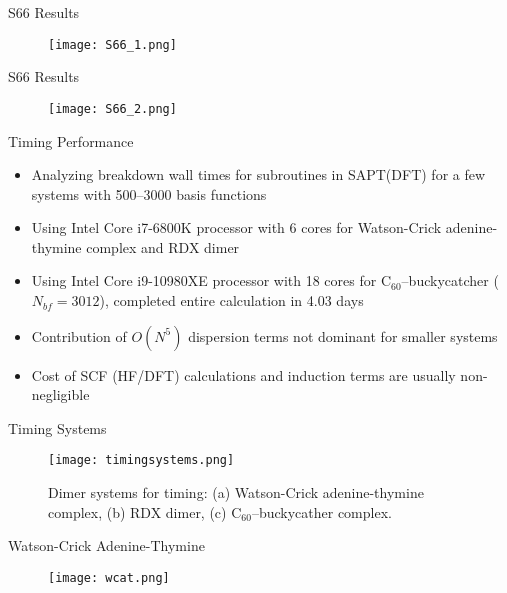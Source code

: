 \documentclass{beamer}
\begin{document}
        \begin{frame}{S66 Results}
            \begin{figure}
                \centering
                \texttt{[image: S66\_1.png]}
            \end{figure}  
        \end{frame}

        \begin{frame}{S66 Results}
            \begin{figure}
                \centering
                \texttt{[image: S66\_2.png]}
            \end{figure}  
        \end{frame}

        \begin{frame}{Timing Performance}
            \begin{itemize}
                \item Analyzing breakdown wall times for subroutines in SAPT(DFT) for a few systems with 500--3000 basis functions
                \item Using Intel Core i7-6800K processor with 6 cores for Watson-Crick adenine-thymine complex and RDX dimer 
                \item Using Intel Core i9-10980XE processor with 18 cores for C$_{60}$--buckycatcher ($N_{bf} = 3012$), completed entire calculation in 4.03 days
                \item Contribution of $O(N^5)$ dispersion terms not dominant for smaller systems
                \item Cost of SCF (HF/DFT) calculations and induction terms are usually non-negligible 
            \end{itemize}
        \end{frame}

        \begin{frame}{Timing Systems}
            \begin{figure}
                \centering
                \texttt{[image: timingsystems.png]}
                \caption{Dimer systems for timing: (a) Watson-Crick adenine-thymine complex, (b) RDX dimer, (c) C$_{60}$--buckycather complex.}
            \end{figure}
        \end{frame}

        \begin{frame}{Watson-Crick Adenine-Thymine}
            \begin{figure}
                \centering
                \texttt{[image: wcat.png]}
            \end{figure}
        \end{frame}
\end{document}

